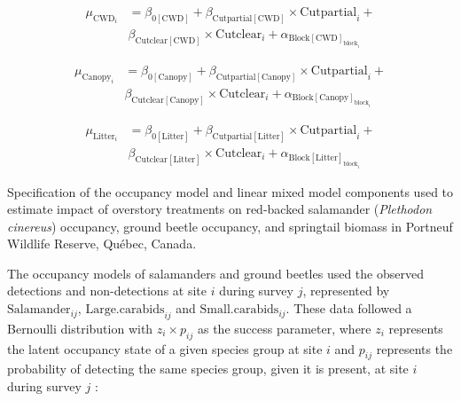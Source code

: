 \begin{align}
  \mu_{\text{CWD}_i} &= \beta_{0[\text{CWD}]} + \beta_{\text{Cutpartial}[\text{CWD}]} \times \text{Cutpartial}_{i} + \nonumber\\
  & \beta_{\text{Cutclear}[\text{CWD}]} \times \text{Cutclear}_{i} + \alpha_{\text{Block}[\text{CWD}]_{\text{block}_i}} 
\end{align}

\begin{align}
  \mu_{\text{Canopy}_i} &= \beta_{0[\text{Canopy}]} + \beta_{\text{Cutpartial}[\text{Canopy}]} \times \text{Cutpartial}_{i} + \nonumber \\
  & \beta_{\text{Cutclear}[\text{Canopy}]} \times \text{Cutclear}_{i} + \alpha_{\text{Block}[\text{Canopy}]_{\text{block}_i}} \nonumber
\end{align}

\begin{align}
  \mu_{\text{Litter}_i} &= \beta_{0[\text{Litter}]} + \beta_{\text{Cutpartial}[\text{Litter}]} \times \text{Cutpartial}_{i} + \nonumber\\
  & \beta_{\text{Cutclear}[\text{Litter}]} \times \text{Cutclear}_{i} + \alpha_{\text{Block}[\text{Litter}]_{\text{block}_i}} \nonumber
\end{align}

\vspace{10pt}

\begin{table}[h!]
   \caption[Specification of the occupancy model and linear mixed model components used to estimate impact of overstory treatments on red-backed salamander (\textit{Plethodon cinereus}) occupancy, ground beetle occupancy, and springtail biomass.]
   {Specification of the occupancy model and linear mixed model components used to estimate impact of overstory treatments on red-backed salamander (\textit{Plethodon cinereus}) occupancy, ground beetle occupancy, and springtail biomass in Portneuf Wildlife Reserve, Québec, Canada.}
   \label{ann:SEM_Sp_eq}
   \end{table}

The occupancy models of salamanders and ground beetles used the observed detections and non-detections at site $i$ during survey $j$, 
represented by $\text{Salamander}_{ij}$, $\text{Large.carabids}_{ij}$ and $\text{Small.carabids}_{ij}$. 
These data followed a Bernoulli distribution with $z_{i} \times p_{ij}$ as the success parameter, 
where $z_{i}$ represents the latent occupancy state of a given species group at site $i$ and $p_{ij}$ represents the probability of detecting the same species group, given it is present, at site $i$ during survey $j$ :


